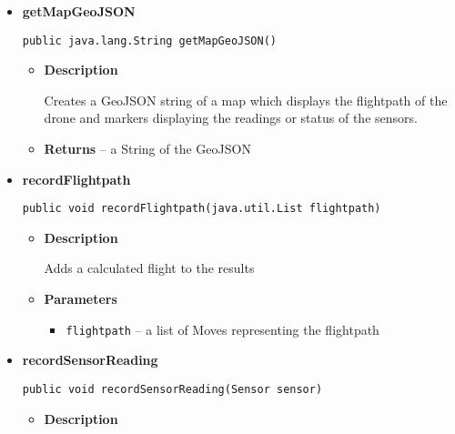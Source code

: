 \documentclass[11pt,a4paper]{report}
\begin{document}
{{{{{{{\begin{itemize}
{\begin{itemize}
{Gets a flightpath String of the following format: 1,\lbrack startLng\rbrack ,\lbrack startLat\rbrack ,\lbrack angle\rbrack ,\lbrack endLng\rbrack ,\lbrack endLat\rbrack ,\lbrack sensor w3w or null\rbrack \textbackslash n 2,\lbrack startLng\rbrack ,\lbrack startLat\rbrack ,\lbrack angle\rbrack ,\lbrack endLng\rbrack ,\lbrack endLat\rbrack ,\lbrack sensor w3w or null\rbrack \textbackslash n ...
}
\item{{\bf  Returns} -- 
the flightpath String 
}%
\end{itemize}
}%
\item{ 
\hypertarget{uk.ac.ed.inf.aqmaps.Results.getMapGeoJSON()}{{\bf  getMapGeoJSON}\\}
\begin{lstlisting}[frame=none]
public java.lang.String getMapGeoJSON()\end{lstlisting} %
\begin{itemize}
\item{
{\bf  Description}

Creates a GeoJSON string of a map which displays the flightpath of the drone and markers displaying the readings or status of the sensors.
}
\item{{\bf  Returns} -- 
a String of the GeoJSON 
}%
\end{itemize}
}%
\item{ 
\hypertarget{uk.ac.ed.inf.aqmaps.Results.recordFlightpath(java.util.List)}{{\bf  recordFlightpath}\\}
\begin{lstlisting}[frame=none]
public void recordFlightpath(java.util.List flightpath)\end{lstlisting} %
\begin{itemize}
\item{
{\bf  Description}

Adds a calculated flight to the results
}
\item{
{\bf  Parameters}
  \begin{itemize}
   \item{
\texttt{flightpath} -- a list of Moves representing the flightpath}
  \end{itemize}
}%
\end{itemize}
}%
\item{ 
\hypertarget{uk.ac.ed.inf.aqmaps.Results.recordSensorReading(uk.ac.ed.inf.aqmaps.Sensor)}{{\bf  recordSensorReading}\\}
\begin{lstlisting}[frame=none]
public void recordSensorReading(Sensor sensor)\end{lstlisting} %
\begin{itemize}
\item{
{\bf  Description}

}
\end{itemize}}
\end{itemize}}}}}}}}
\end{document}
